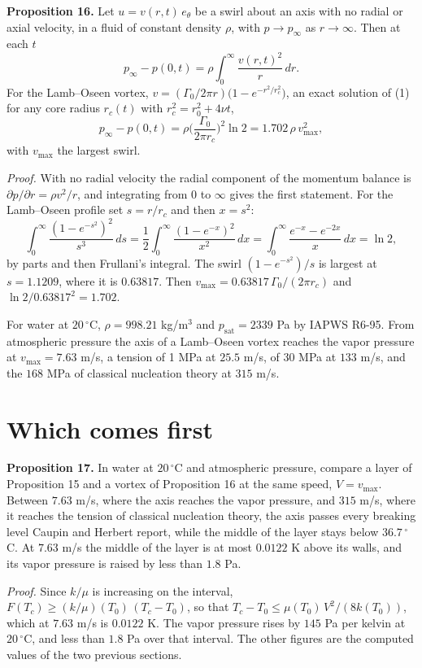\textbf{Proposition 16.} Let $u = v(r,t)\,e_\theta$ be a swirl about an axis with no radial or
axial velocity, in a fluid of constant density $\rho$, with $p \to p_\infty$ as $r\to\infty$. Then
at each $t$
\[
p_\infty - p(0,t) = \rho\int_0^\infty \frac{v(r,t)^2}{r}\,dr .
\]
For the Lamb--Oseen vortex, $v = (\Gamma_0/2\pi r)\big(1 - e^{-r^2/r_c^2}\big)$, an exact solution
of (1) for any core radius $r_c(t)$ with $r_c^2 = r_0^2 + 4\nu t$,
\[
p_\infty - p(0,t) = \rho\Big(\frac{\Gamma_0}{2\pi r_c}\Big)^2\ln 2 = 1.702\,\rho\,v_{\max}^2 ,
\]
with $v_{\max}$ the largest swirl.

\emph{Proof.} With no radial velocity the radial component of the momentum balance is
$\partial p/\partial r = \rho v^2/r$, and integrating from $0$ to $\infty$ gives the first
statement. For the Lamb--Oseen profile set $s = r/r_c$ and then $x = s^2$:
\[
\int_0^\infty\frac{(1-e^{-s^2})^2}{s^3}\,ds = \frac12\int_0^\infty\frac{(1-e^{-x})^2}{x^2}\,dx
= \int_0^\infty\frac{e^{-x} - e^{-2x}}{x}\,dx = \ln 2,
\]
by parts and then Frullani's integral. The swirl $(1 - e^{-s^2})/s$ is largest at $s = 1.1209$,
where it is $0.63817$. Then $v_{\max} = 0.63817\,\Gamma_0/(2\pi r_c)$ and
$\ln 2/0.63817^2 = 1.702$. \hfill\qedsymbol

For water at $20\,^\circ$C, $\rho = 998.21$ kg/m$^3$ and $p_{\mathrm{sat}} = 2339$ Pa by IAPWS
R6-95. From atmospheric pressure the axis of a Lamb--Oseen vortex reaches the vapor pressure at
$v_{\max} = 7.63$ m/s, a tension of 1 MPa at $25.5$ m/s, of 30 MPa at $133$ m/s, and the $168$ MPa
of classical nucleation theory at $315$ m/s.

\section{Which comes first}

\textbf{Proposition 17.} In water at $20\,^\circ$C and atmospheric pressure, compare a layer of
Proposition 15 and a vortex of Proposition 16 at the same speed, $V = v_{\max}$. Between $7.63$
m/s, where the axis reaches the vapor pressure, and $315$ m/s, where it reaches the tension of
classical nucleation theory, the axis passes every breaking level Caupin and Herbert report, while
the middle of the layer stays below $36.7\,^\circ$C. At $7.63$ m/s the middle of the layer is at
most $0.0122$ K above its walls, and its vapor pressure is raised by less than $1.8$ Pa.

\emph{Proof.} Since $k/\mu$ is increasing on the interval, $F(T_c) \ge (k/\mu)(T_0)\,(T_c - T_0)$,
so that $T_c - T_0 \le \mu(T_0)\,V^2/(8k(T_0))$, which at $7.63$ m/s is $0.0122$ K. The vapor
pressure rises by $145$ Pa per kelvin at $20\,^\circ$C, and less than $1.8$ Pa over that interval.
The other figures are the computed values of the two previous sections. \hfill\qedsymbol

